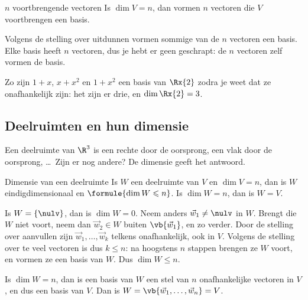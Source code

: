 \begin{theorie}
\begin{stelling}{$n$ voortbrengende vectoren}
Is $\dim V = n$, dan vormen $n$ vectoren die $V$ voortbrengen een basis.
\end{stelling}

\begin{bewijs}
Volgens de stelling over uitdunnen vormen sommige van de $n$ vectoren een basis. Elke basis heeft $n$ vectoren, dus je hebt er geen geschrapt: de $n$ vectoren zelf vormen de basis.
\end{bewijs}
\end{theorie}

Zo zijn $1 + x$, $x + x^2$ en $1 + x^2$ een basis van $\Rx{2}$ zodra je weet dat ze onafhankelijk zijn: het zijn er drie, en $\dim \Rx{2} = 3$.

\subsection{Deelruimten en hun dimensie}

Een deelruimte van $\R^3$ is een rechte door de oorsprong, een vlak door de oorsprong, \ldots\ Zijn er nog andere? De dimensie geeft het antwoord.

\begin{theorie}
\begin{stelling}{Dimensie van een deelruimte}
Is $W$ een deelruimte van $V$ en $\dim V = n$, dan is $W$ eindigdimensionaal en $\formule{\dim W \leqslant n}$. Is $\dim W = n$, dan is $W = V$.
\end{stelling}

\begin{bewijs}
Is $W = \{\nulv\}$, dan is $\dim W = 0$. Neem anders $\vec w_1 \neq \nulv$ in $W$. Brengt die $W$ niet voort, neem dan $\vec w_2 \in W$ buiten $\vb{\vec w_1}$, en zo verder. Door de stelling over aanvullen zijn $\vec w_1, \ldots, \vec w_k$ telkens onafhankelijk, ook in $V$. Volgens de stelling over te veel vectoren is dus $k \leqslant n$: na hoogstens $n$ stappen brengen ze $W$ voort, en vormen ze een basis van $W$. Dus $\dim W \leqslant n$.

Is $\dim W = n$, dan is een basis van $W$ een stel van $n$ onafhankelijke vectoren in $V$, en dus een basis van $V$. Dan is $W = \vb{\vec w_1, \ldots, \vec w_n} = V$.
\end{bewijs}
\end{theorie}

